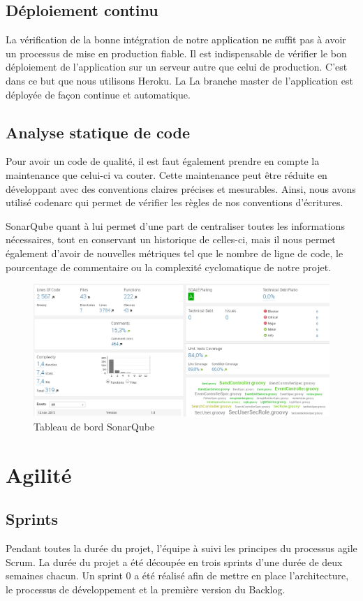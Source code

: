 \documentclass[12pt,a4paper,oneside]{book}
\begin{document}
	\section{Déploiement continu}
	La vérification de la bonne intégration de notre application ne suffit pas à avoir un processus de mise en production fiable. Il est indispensable de vérifier le bon déploiement de l'application sur un serveur autre que celui de production. C'est dans ce but que nous utilisons Heroku. La La branche master de l'application est déployée de façon continue et automatique.
	
	\section{Analyse statique de code}
	Pour avoir un code de qualité, il est faut également prendre en compte la maintenance que celui-ci va couter. Cette maintenance peut être réduite en développant avec des conventions claires précises et mesurables. 
	Ainsi, nous avons utilisé codenarc qui permet de vérifier les règles de nos conventions d’écritures. 
	
	SonarQube quant à lui permet d’une part de centraliser toutes les informations nécessaires, tout en conservant un historique de celles-ci, mais il nous permet également d’avoir de nouvelles métriques tel que le nombre de ligne de code, le pourcentage de commentaire ou la complexité cyclomatique de notre projet. 

	\begin{figure}[H]
		\centering
		\includegraphics[width=18cm]{../beamer/images/Results/methodo/sonar.png}
		\caption{Tableau de bord SonarQube}
	\end{figure}
	
	\chapter{Agilité}
	\section{Sprints}	
	Pendant toutes la durée du projet, l’équipe à suivi les principes du processus agile Scrum. La durée du projet a été découpée en trois sprints d’une durée de deux semaines chacun. Un sprint 0 a été réalisé afin de mettre en place l’architecture, le processus de développement et la première version du Backlog.
	
\end{document}
